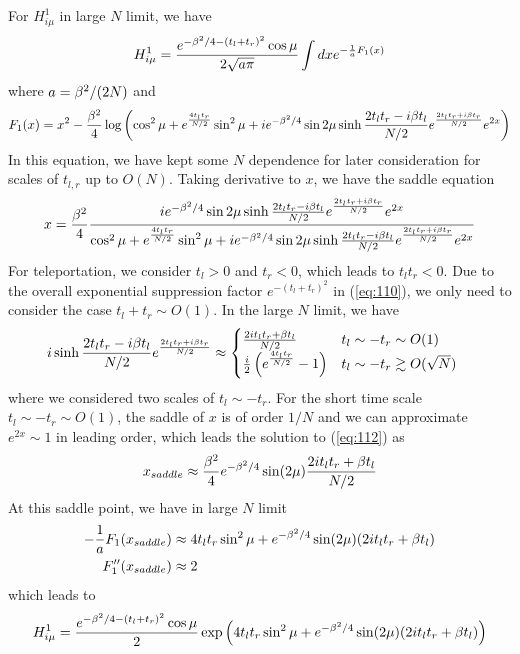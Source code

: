 \documentclass[11pt]{article}
\renewcommand{\>}{\rangle}
\newcommand{\<}{\langle}
\begin{document}
For $H_{i\mu}^{1}$ in large $N$ limit, we have
\begin{equation}
H_{i\mu}^{1}=\frac{e^{-\beta^{2}/4-(t_{l}+t_{r})^{2}}\cos\mu}{2\sqrt{a\pi}}\int dxe^{-\frac{1}{a}F_{1}(x)}\label{eq:110}
\end{equation}
where $a=\beta^{2}/(2N)$ and 
\begin{equation}
F_{1}(x)=x^{2}-\frac{\beta^{2}}{4}\log\left(\cos^{2}\mu+e^{\frac{4t_{l}t_{r}}{N/2}}\sin^{2}\mu+ie^{-\beta^{2}/4}\sin2\mu\sinh\frac{2t_{l}t_{r}-i\beta t_{l}}{N/2}e^{\frac{2t_{l}t_{r}+i\beta t_{r}}{N/2}}e^{2x}\right)
\end{equation}
In this equation, we have kept some $N$ dependence for later consideration
for scales of $t_{l,r}$ up to $O(N)$. Taking derivative to $x$,
we have the saddle equation
\begin{equation}
x=\frac{\beta^{2}}{4}\frac{ie^{-\beta^{2}/4}\sin2\mu\sinh\frac{2t_{l}t_{r}-i\beta t_{l}}{N/2}e^{\frac{2t_{l}t_{r}+i\beta t_{r}}{N/2}}e^{2x}}{\cos^{2}\mu+e^{\frac{4t_{l}t_{r}}{N/2}}\sin^{2}\mu+ie^{-\beta^{2}/4}\sin2\mu\sinh\frac{2t_{l}t_{r}-i\beta t_{l}}{N/2}e^{\frac{2t_{l}t_{r}+i\beta t_{r}}{N/2}}e^{2x}}\label{eq:112}
\end{equation}
For teleportation, we consider $t_{l}>0$ and $t_{r}<0$, which leads
to $t_{l}t_{r}<0$. Due to the overall exponential suppression factor
$e^{-(t_{l}+t_{r})^{2}}$ in (\ref{eq:110}), we only need to consider
the case $t_{l}+t_{r}\sim O(1)$. In the large $N$ limit, we have
\begin{align}
i\sinh\frac{2t_{l}t_{r}-i\beta t_{l}}{N/2}e^{\frac{2t_{l}t_{r}+i\beta t_{r}}{N/2}} & \approx\begin{cases}
\frac{2it_{l}t_{r}+\beta t_{l}}{N/2} & t_{l}\sim-t_{r}\sim O(1)\\
\frac{i}{2}\left(e^{\frac{4t_{l}t_{r}}{N/2}}-1\right) & t_{l}\sim-t_{r}\gtrsim O(\sqrt{N})
\end{cases}\label{eq:113}
\end{align}
where we considered two scales of $t_{l}\sim-t_{r}$. For the short
time scale $t_{l}\sim-t_{r}\sim O(1)$, the saddle of $x$ is of order
$1/N$ and we can approximate $e^{2x}\sim1$ in leading order, which
leads the solution to (\ref{eq:112}) as
\begin{equation}
x_{saddle}\approx\frac{\beta^{2}}{4}e^{-\beta^{2}/4}\sin(2\mu)\frac{2it_{l}t_{r}+\beta t_{l}}{N/2}
\end{equation}
At this saddle point, we have in large $N$ limit
\begin{align}
-\frac{1}{a}F_{1}(x_{saddle}) & \approx4t_{l}t_{r}\sin^{2}\mu+e^{-\beta^{2}/4}\sin(2\mu)(2it_{l}t_{r}+\beta t_{l})\\
F''_{1}(x_{saddle}) & \approx2
\end{align}
which leads to
\begin{equation}
H_{i\mu}^{1}=\frac{e^{-\beta^{2}/4-(t_{l}+t_{r})^{2}}\cos\mu}{2}\exp\left(4t_{l}t_{r}\sin^{2}\mu+e^{-\beta^{2}/4}\sin(2\mu)(2it_{l}t_{r}+\beta t_{l})\right)\label{eq:h1-short}
\end{equation}
\end{document}
